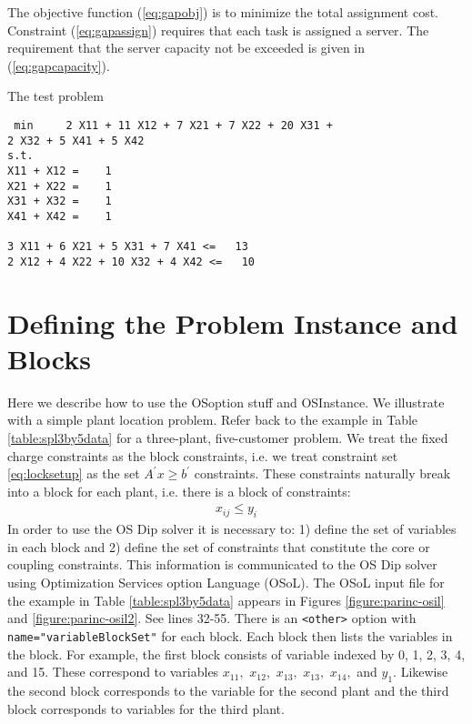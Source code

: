 \documentclass[11pt]{article}
\newcounter{Fig}
\begin{document}
The objective function (\ref{eq:gapobj}) is to minimize the total assignment cost.  Constraint
(\ref{eq:gapassign}) requires that each task is assigned a server.  The requirement that the
server capacity not be exceeded is given in (\ref{eq:gapcapacity}). 

The test problem


\begin{verbatim}
 min     2 X11 + 11 X12 + 7 X21 + 7 X22 + 20 X31 + 
2 X32 + 5 X41 + 5 X42
s.t.
X11 + X12 =    1
X21 + X22 =    1
X31 + X32 =    1
X41 + X42 =    1

3 X11 + 6 X21 + 5 X31 + 7 X41 <=   13
2 X12 + 4 X22 + 10 X32 + 4 X42 <=   10
\end{verbatim}
 

 

\section{Defining the Problem Instance and Blocks}\label{section:defineinstance}

Here we describe how to use the OSoption stuff and OSInstance.  We illustrate
with a simple plant location problem. Refer back to the example in Table
\ref{table:spl3by5data} for a three-plant, five-customer problem. We treat the
fixed charge constraints as the block constraints, i.e. we treat constraint set
\ref{eq:locksetup} as the set $A^{\prime} x \ge b^{\prime}$ constraints. These
constraints naturally break into a block for each plant, i.e. there is a block
of constraints:
\begin{eqnarray}
x_{ij} \le y_{i}
\end{eqnarray}
In order to use the OS Dip solver it is necessary to: 1) define the set of
variables in each block and 2) define the set of constraints that constitute the
core or coupling constraints. This information is communicated to the OS Dip
solver using Optimization Services option Language (OSoL). The OSoL input file
for the example in Table \ref{table:spl3by5data} appears in Figures
\ref{figure:parinc-osil} and \ref{figure:parinc-osil2}.  See lines 32-55. There
is an {\tt <other>} option with {\tt name="variableBlockSet"} for each block.
Each block then lists the variables in the block. For example, the first block
consists of variable indexed by 0, 1, 2, 3, 4, and 15. These correspond to
variables $x_{11},$  $x_{12},$  $x_{13},$  $x_{13},$ $x_{14},$ and  $y_{1}.$
Likewise the second block corresponds to the variable for the second plant and
the third block corresponds to variables for the third plant.
\end{document}
